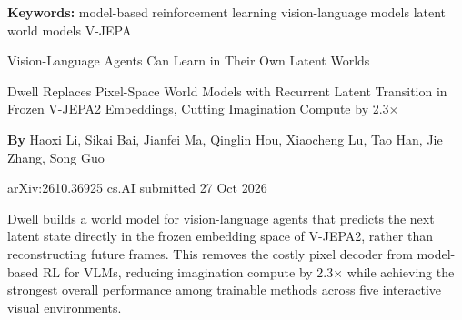 \documentclass[10pt,twocolumn]{article}
\begin{document}
\setlength{\parindent}{0pt}
\setlength{\parskip}{4pt}

{\small\color{keywordgray}\textbf{Keywords:}
  model-based reinforcement learning \textbullet{}
  vision-language models \textbullet{}
  latent world models \textbullet{}
  V-JEPA}\par\vspace{4pt}

{\LARGE\bfseries\raggedright
  Vision-Language Agents Can Learn in Their Own Latent Worlds}\par\vspace{4pt}

{\large\itshape\raggedright
  Dwell Replaces Pixel-Space World Models with Recurrent Latent
  Transition in Frozen V-JEPA2 Embeddings, Cutting Imagination
  Compute by 2.3$\times$}\par\vspace{6pt}

{\small\textbf{By} Haoxi Li, Sikai Bai, Jianfei Ma, Qinglin Hou,
  Xiaocheng Lu, Tao Han, Jie Zhang, Song Guo}\par\vspace{2pt}

{\small\color{keywordgray}arXiv:2610.36925 \textbullet{} cs.AI
  \textbullet{} submitted 27 Oct 2026}
\par\vspace{2pt}\noindent{\color{rulered}\rule{\columnwidth}{0.6pt}}\vspace{6pt}

Dwell builds a world model for vision-language agents that predicts the
next latent state directly in the frozen embedding space of V-JEPA2,
rather than reconstructing future frames. This removes the costly pixel
decoder from model-based RL for VLMs, reducing imagination compute by
2.3$\times$ while achieving the strongest overall performance among
trainable methods across five interactive visual environments.
\end{document}
